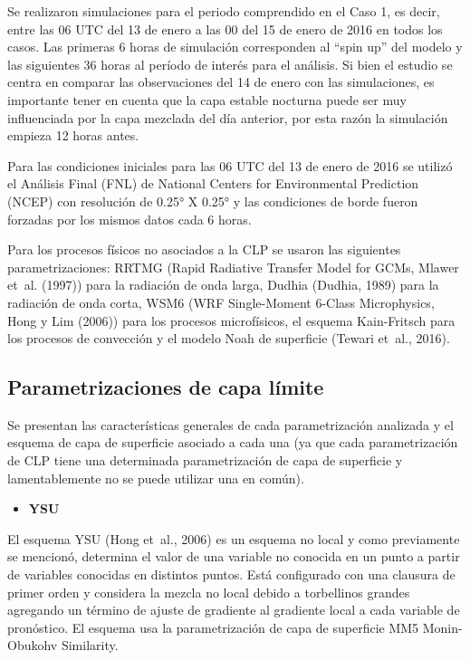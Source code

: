 \documentclass[12pt,spanish,oneside]{book}
\providecommand{\tightlist}{%
  \setlength{\itemsep}{0pt}\setlength{\parskip}{0pt}}
\begin{document}
Se realizaron simulaciones para el periodo comprendido en el Caso 1, es
decir, entre las 06 UTC del 13 de enero a las 00 del 15 de enero de 2016
en todos los casos. Las primeras 6 horas de simulación corresponden al
``spin up'' del modelo y las siguientes 36 horas al período de interés
para el análisis. Si bien el estudio se centra en comparar las
observaciones del 14 de enero con las simulaciones, es importante tener
en cuenta que la capa estable nocturna puede ser muy influenciada por la
capa mezclada del día anterior, por esta razón la simulación empieza 12
horas antes.

Para las condiciones iniciales para las 06 UTC del 13 de enero de 2016
se utilizó el Análisis Final (FNL) de National Centers for Environmental
Prediction (NCEP) con resolución de 0.25° X 0.25° y las condiciones de
borde fueron forzadas por los mismos datos cada 6 horas.

Para los procesos físicos no asociados a la CLP se usaron las siguientes
parametrizaciones: RRTMG (Rapid Radiative Transfer Model for GCMs,
Mlawer et~al. (1997)) para la radiación de onda larga, Dudhia (Dudhia,
1989) para la radiación de onda corta, WSM6 (WRF Single-Moment 6-Class
Microphysics, Hong y Lim (2006)) para los procesos microfísicos, el
esquema Kain-Fritsch para los procesos de convección y el modelo Noah de
superficie (Tewari et~al., 2016).

\subsection{Parametrizaciones de capa
límite}\label{parametrizaciones-de-capa-limite}

Se presentan las características generales de cada parametrización
analizada y el esquema de capa de superficie asociado a cada una (ya que
cada parametrización de CLP tiene una determinada parametrización de
capa de superficie y lamentablemente no se puede utilizar una en común).

\begin{itemize}
\tightlist
\item
  \textbf{YSU}
\end{itemize}

El esquema YSU (Hong et~al., 2006) es un esquema no local y como
previamente se mencionó, determina el valor de una variable no conocida
en un punto a partir de variables conocidas en distintos puntos. Está
configurado con una clausura de primer orden y considera la mezcla no
local debido a torbellinos grandes agregando un término de ajuste de
gradiente al gradiente local a cada variable de pronóstico. El esquema
usa la parametrización de capa de superficie MM5 Monin-Obukohv
Similarity.
\end{document}
